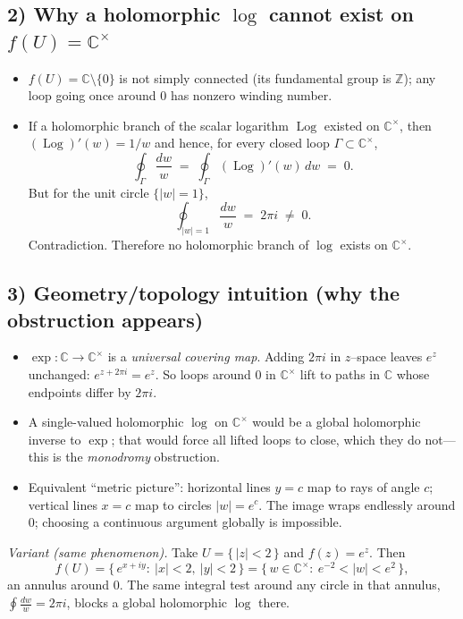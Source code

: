 \documentclass[11pt]{article}
\DeclareMathOperator{\Log}{Log}
\begin{document}
\bigskip

\subsection*{2) Why a holomorphic $\log$ cannot exist on $f(U)=\mathbb{C}^{\times}$}

\begin{itemize}
\item $f(U)=\mathbb{C}\setminus\{0\}$ is not simply connected (its fundamental group is $\mathbb{Z}$);
any loop going once around $0$ has nonzero winding number.
\item If a holomorphic branch of the scalar logarithm $\Log$ existed on $\mathbb{C}^{\times}$, then
$(\Log)'(w)=1/w$ and hence, for every closed loop $\Gamma\subset\mathbb{C}^{\times}$,
\[
\oint_{\Gamma}\frac{dw}{w}
\;=\;
\oint_{\Gamma}(\Log)'(w)\,dw
\;=\;0.
\]
But for the unit circle $\{|w|=1\}$,
\[
\oint_{|w|=1}\frac{dw}{w} \;=\; 2\pi i \;\neq\; 0.
\]
Contradiction. Therefore no holomorphic branch of $\log$ exists on $\mathbb{C}^{\times}$.
\end{itemize}

\bigskip

\subsection*{3) Geometry/topology intuition (why the obstruction appears)}

\begin{itemize}
\item $\exp:\mathbb{C}\to\mathbb{C}^{\times}$ is a \emph{universal covering map}.
Adding $2\pi i$ in $z$–space leaves $e^{z}$ unchanged: $e^{z+2\pi i}=e^{z}$.
So loops around $0$ in $\mathbb{C}^{\times}$ lift to paths in $\mathbb{C}$ whose endpoints differ by $2\pi i$.
\item A single-valued holomorphic $\log$ on $\mathbb{C}^{\times}$ would be a global holomorphic inverse to $\exp$;
that would force all lifted loops to close, which they do not—this is the \emph{monodromy} obstruction.
\item Equivalent “metric picture”: horizontal lines $y=c$ map to rays of angle $c$; vertical lines $x=c$ map to circles
$|w|=e^{c}$. The image wraps endlessly around $0$; choosing a continuous argument globally is impossible.
\end{itemize}

\medskip

\noindent\textit{Variant (same phenomenon).}
Take $U=\{\,|z|<2\,\}$ and $f(z)=e^{z}$.
Then
\[
f(U)=\{\,e^{x+iy}:\ |x|<2,\ |y|<2\,\}
=\{\,w\in\mathbb{C}^{\times}:\ e^{-2}<|w|<e^{2}\,\},
\]
an annulus around $0$. The same integral test around any circle in that annulus,
$\displaystyle \oint \frac{dw}{w}=2\pi i$, blocks a global holomorphic $\log$ there.
	
\end{document}
